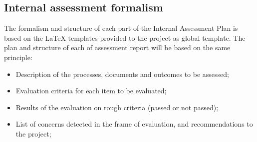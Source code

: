 \documentclass[openetcs]{template/openetcs_article}
\begin{document}
\subsection{Internal assessment formalism}
The formalism and structure of each part of the Internal Assessment Plan is based on the LaTeX templates provided to the project as global template.
The plan and structure of each of assessment report will be based on the same principle:
 \begin{itemize}
\item Description of the processes, documents and outcomes to be assessed;
\item Evaluation criteria for each item to be evaluated;
\item Results of the evaluation on rough criteria (passed or not passed);
\item List of concerns detected in the frame of evaluation, and recommendations to the project;
\end{itemize}







\end{document}
